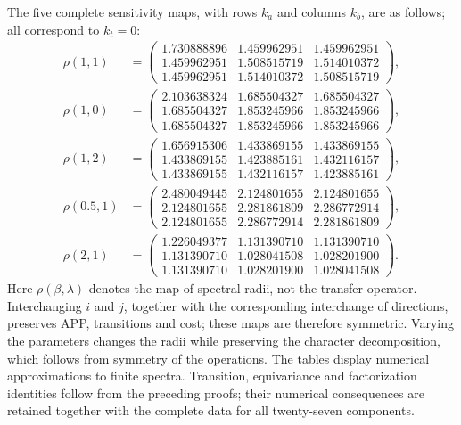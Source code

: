 The five complete sensitivity maps, with rows $k_a$ and columns $k_b$,
are as follows; all correspond to $k_t=0$:
\begin{align*}
\rho(1,1)&=\begin{pmatrix}
1.730888896&1.459962951&1.459962951\\
1.459962951&1.508515719&1.514010372\\
1.459962951&1.514010372&1.508515719
\end{pmatrix},\\
\rho(1,0)&=\begin{pmatrix}
2.103638324&1.685504327&1.685504327\\
1.685504327&1.853245966&1.853245966\\
1.685504327&1.853245966&1.853245966
\end{pmatrix},\\
\rho(1,2)&=\begin{pmatrix}
1.656915306&1.433869155&1.433869155\\
1.433869155&1.423885161&1.432116157\\
1.433869155&1.432116157&1.423885161
\end{pmatrix},\\
\rho(0.5,1)&=\begin{pmatrix}
2.480049445&2.124801655&2.124801655\\
2.124801655&2.281861809&2.286772914\\
2.124801655&2.286772914&2.281861809
\end{pmatrix},\\
\rho(2,1)&=\begin{pmatrix}
1.226049377&1.131390710&1.131390710\\
1.131390710&1.028041508&1.028201900\\
1.131390710&1.028201900&1.028041508
\end{pmatrix}.
\end{align*}
Here $\rho(\beta,\lambda)$ denotes the map of spectral radii, not the
transfer operator. Interchanging $i$ and $j$, together with the
corresponding interchange of directions, preserves APP, transitions and
cost; these maps are therefore symmetric. Varying the parameters changes the radii while preserving the
character decomposition, which follows from symmetry of the operations.
The tables display numerical approximations to finite spectra. Transition,
equivariance and factorization identities follow from the preceding proofs;
their numerical consequences are retained together with the complete data
for all twenty-seven components.

